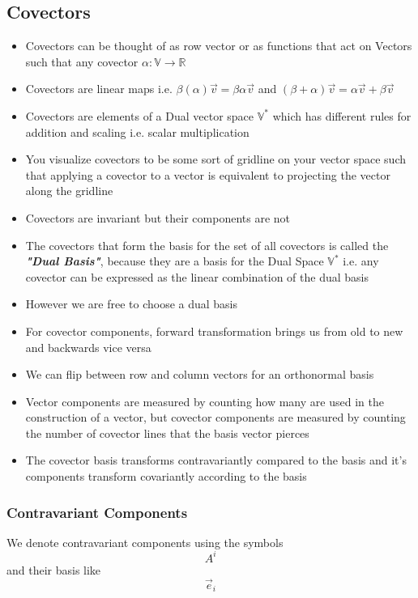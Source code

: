 \subsection{Covectors}
\begin{itemize}
	\item Covectors can be thought of as row vector or as functions that act on Vectors such that any covector $\alpha : \mathbb{V} \rightarrow \mathbb{R}$
	\item Covectors are linear maps i.e. $ \beta ( \alpha ) \vec{v} = \beta \alpha \vec{v}$ and $(\beta + \alpha ) \vec{v} = \alpha \vec{v} + \beta \vec{v}$
	\item Covectors are elements of a Dual vector space $\mathbb{V}^*$ which has different rules for addition and scaling i.e. scalar multiplication
	\item You visualize covectors to be some sort of gridline on your vector space such that applying a covector to a vector is equivalent to projecting the vector along the gridline
	\item Covectors are invariant but their components are not
	\item The covectors that form the basis for the set of all covectors is called the \textit{\textbf{"Dual Basis"}}, because they are a basis for the Dual Space $\mathbb{V}^*$ i.e. any covector can be expressed as the linear combination of the dual basis
	\item However we are free to choose a dual basis
	\item For covector components, forward transformation brings us from old to new and backwards vice versa
	\item We can flip between row and column vectors for an orthonormal basis
	\item Vector components are measured by counting how many are used in the construction of a vector, but covector components are measured by counting the number of covector lines that the basis vector pierces
	\item The covector basis transforms contravariantly compared to the basis and it's components transform covariantly according to the basis 
\end{itemize}


\subsubsection{Contravariant Components}
We denote contravariant components using the symbols
$$A^i$$
and their basis like
$$\overrightarrow{e}_i$$
